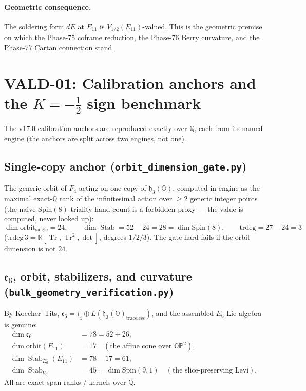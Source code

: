 \documentclass[11pt]{article}
\newcommand{\hO}{\mathfrak{h}_3(\mathbb{O})}
\newcommand{\OP}{\mathbb{OP}^2}
\newcommand{\Eoneone}{E_{11}}
\newcommand{\Vhalf}{V_{1/2}}
\newcommand{\Tr}{\operatorname{Tr}}
\newcommand{\Stab}{\operatorname{Stab}}
\newcommand{\fr}{\mathfrak{f}_4}
\newcommand{\er}{\mathfrak{e}_6}
\begin{document}
\paragraph{Geometric consequence.} The soldering form $dE$ at $\Eoneone$ is
$\Vhalf(\Eoneone)$-valued. This is the geometric premise on which the Phase-75
coframe reduction, the Phase-76 Berry curvature, and the Phase-77 Cartan
connection stand.

\section{VALD-01: Calibration anchors and the $K=-\tfrac12$ sign benchmark}
\label{sec:vald01}
The v17.0 calibration anchors are reproduced exactly over $\mathbb{Q}$, each from
its named engine (the anchors are split across two engines, not one).

\subsection{Single-copy anchor (\texttt{orbit\_dimension\_gate.py})}
The generic orbit of $F_4$ acting on one copy of $\hO$, computed in-engine as the
maximal exact-$\mathbb{Q}$ rank of the infinitesimal action over $\ge 2$ generic
integer points (the naive $\mathrm{Spin}(8)$-triality hand-count is a forbidden
proxy --- the value is computed, never looked up):
\begin{equation}
\dim\mathrm{orbit}_{\mathrm{single}}=24,
\qquad
\dim\Stab=52-24=28=\dim\mathrm{Spin}(8),
\qquad
\mathrm{trdeg}=27-24=3
\end{equation}
($\mathrm{trdeg}\,3=\mathbb{R}[\Tr,\Tr^2,\det]$, degrees $1/2/3$). The gate
hard-fails if the orbit dimension is not $24$.

\subsection{$\er$, orbit, stabilizers, and curvature
(\texttt{bulk\_geometry\_verification.py})}
By Koecher--Tits, $\er=\fr\oplus L(\hO_{\text{traceless}})$, and the assembled
$E_6$ Lie algebra is genuine:
\begin{align}
\dim\er&=78=52+26, \\
\dim\mathrm{orbit}(\Eoneone)&=17 \quad(\text{the affine cone over }\OP), \\
\dim\Stab_{E_6}(\Eoneone)&=78-17=61, \\
\dim\Stab_{V_0}&=45=\dim\mathrm{Spin}(9,1)\quad(\text{the slice-preserving Levi}).
\end{align}
All are exact span-ranks / kernels over $\mathbb{Q}$.
\end{document}
